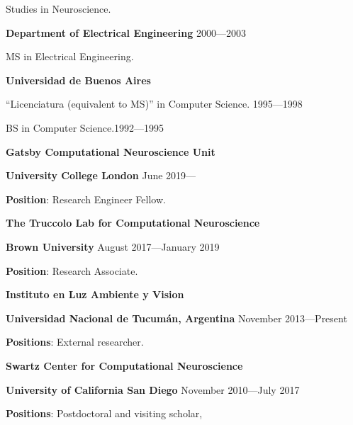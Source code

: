 \documentclass{article}
\begin{document}
\par
Studies in Neuroscience.

\vspace{.05in}
{\bf Department of Electrical Engineering} \hspace*{\fill} 2000---2003

\par
MS in Electrical Engineering.

\par
\vspace{.1in}
{\bf Universidad de Buenos Aires}
\par
``Licenciatura (equivalent to MS)'' in Computer Science.
\hfill 1995---1998
\par
BS in Computer Science.\hfill 1992---1995

\par
\vspace{2\baselineskip}
{\bf Gatsby Computational Neuroscience Unit}
\par
{\bf University College London} \hspace*{\fill} June 2019---
\par
{\bf Position}: Research Engineer Fellow.

\par
\vspace{.1in}
{\bf The Truccolo Lab for Computational Neuroscience}
\par
{\bf Brown University} \hspace*{\fill} August 2017---January 2019
\par
{\bf Position}: Research Associate.

\par
\vspace{.1in}
{\bf Instituto en Luz Ambiente y Vision}
\par
{\bf Universidad Nacional de Tucum\'{a}n, Argentina} \hspace*{\fill} November 2013---Present
\par
{\bf Positions}: External researcher.

\par
\vspace{.1in}
{\bf Swartz Center for Computational Neuroscience}
\par
{\bf University of California San Diego} \hspace*{\fill} November 2010---July 2017
\par
{\bf Positions}: Postdoctoral and visiting scholar,
\end{document}
